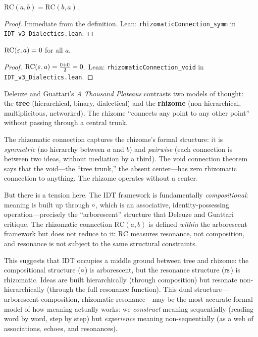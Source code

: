 \begin{theorem}
\label{thm:rc-symm}
$\mathrm{RC}(a, b) = \mathrm{RC}(b, a)$.
\end{theorem}

\begin{proof}
Immediate from the definition.
Lean: \texttt{rhizomaticConnection\_symm} in
\texttt{IDT\_v3\_Dialectics.lean}.
\end{proof}

\begin{theorem}
\label{thm:rc-void}
$\mathrm{RC}(\varepsilon, a) = 0$ for all $a$.
\end{theorem}

\begin{proof}
$\mathrm{RC}(\varepsilon, a) = \frac{0 + 0}{2} = 0$.
Lean: \texttt{rhizomaticConnection\_void} in
\texttt{IDT\_v3\_Dialectics.lean}.
\end{proof}

\begin{interpretation}
Deleuze and Guattari's \textit{A Thousand Plateaus} contrasts two models of
thought: the \textbf{tree} (hierarchical, binary, dialectical) and the
\textbf{rhizome} (non-hierarchical, multiplicitous, networked). The rhizome
``connects any point to any other point'' without passing through a central
trunk.

The rhizomatic connection captures the rhizome's formal structure: it is
\emph{symmetric} (no hierarchy between $a$ and $b$) and \emph{pairwise}
(each connection is between two ideas, without mediation by a third). The
void connection theorem says that the void---the ``tree trunk,'' the absent
center---has zero rhizomatic connection to anything. The rhizome operates
without a center.

But there is a tension here. The IDT framework is fundamentally
\emph{compositional}: meaning is built up through $\circ$, which is an
associative, identity-possessing operation---precisely the ``arborescent''
structure that Deleuze and Guattari critique. The rhizomatic connection
$\mathrm{RC}(a, b)$ is defined \emph{within} the arborescent framework
but does not reduce to it: $\mathrm{RC}$ measures resonance, not
composition, and resonance is not subject to the same structural constraints.

This suggests that IDT occupies a middle ground between tree and rhizome:
the compositional structure ($\circ$) is arborescent, but the resonance
structure ($\mathrm{rs}$) is rhizomatic. Ideas are built hierarchically (through
composition) but resonate non-hierarchically (through the full resonance
function). This dual structure---arborescent composition, rhizomatic
resonance---may be the most accurate formal model of how meaning actually
works: we \emph{construct} meaning sequentially (reading word by word,
step by step) but \emph{experience} meaning non-sequentially (as a web of
associations, echoes, and resonances).
\end{interpretation}


